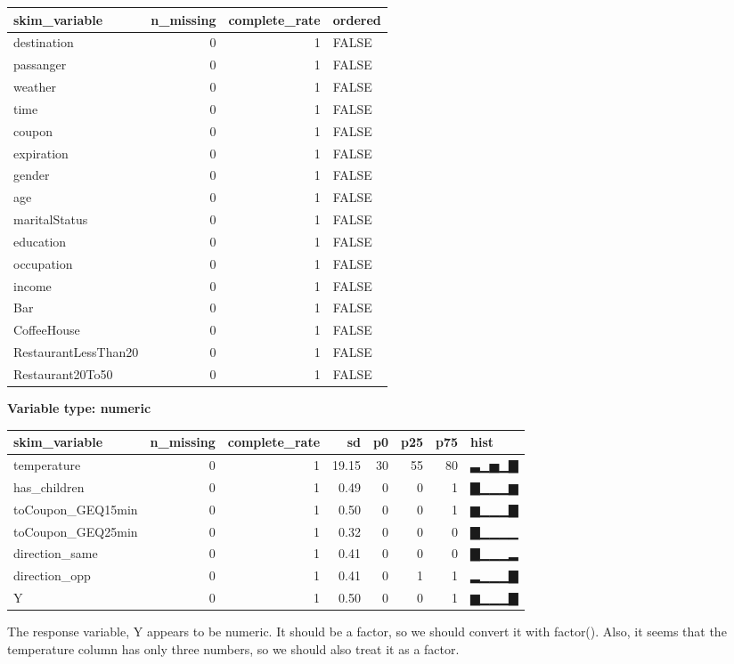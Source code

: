 \documentclass[
]{article}
\begin{document}
\begin{longtable}[]{@{}lrrl@{}}
\toprule
skim\_variable & n\_missing & complete\_rate & ordered \\
\midrule
\endhead
destination & 0 & 1 & FALSE \\
passanger & 0 & 1 & FALSE \\
weather & 0 & 1 & FALSE \\
time & 0 & 1 & FALSE \\
coupon & 0 & 1 & FALSE \\
expiration & 0 & 1 & FALSE \\
gender & 0 & 1 & FALSE \\
age & 0 & 1 & FALSE \\
maritalStatus & 0 & 1 & FALSE \\
education & 0 & 1 & FALSE \\
occupation & 0 & 1 & FALSE \\
income & 0 & 1 & FALSE \\
Bar & 0 & 1 & FALSE \\
CoffeeHouse & 0 & 1 & FALSE \\
RestaurantLessThan20 & 0 & 1 & FALSE \\
Restaurant20To50 & 0 & 1 & FALSE \\
\bottomrule
\end{longtable}

\textbf{Variable type: numeric}

\begin{longtable}[]{@{}lrrrrrrl@{}}
\toprule
skim\_variable & n\_missing & complete\_rate & sd & p0 & p25 & p75 &
hist \\
\midrule
\endhead
temperature & 0 & 1 & 19.15 & 30 & 55 & 80 & ▃▁▅▁▇ \\
has\_children & 0 & 1 & 0.49 & 0 & 0 & 1 & ▇▁▁▁▆ \\
toCoupon\_GEQ15min & 0 & 1 & 0.50 & 0 & 0 & 1 & ▆▁▁▁▇ \\
toCoupon\_GEQ25min & 0 & 1 & 0.32 & 0 & 0 & 0 & ▇▁▁▁▁ \\
direction\_same & 0 & 1 & 0.41 & 0 & 0 & 0 & ▇▁▁▁▂ \\
direction\_opp & 0 & 1 & 0.41 & 0 & 1 & 1 & ▂▁▁▁▇ \\
Y & 0 & 1 & 0.50 & 0 & 0 & 1 & ▆▁▁▁▇ \\
\bottomrule
\end{longtable}

The response variable, Y appears to be numeric. It should be a factor,
so we should convert it with factor(). Also, it seems that the
temperature column has only three numbers, so we should also treat it as
a factor.
\end{document}
